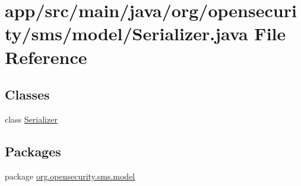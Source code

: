 \hypertarget{a00026}{\section{app/src/main/java/org/opensecurity/sms/model/\+Serializer.java File Reference}
\label{a00026}
}
\subsection*{Classes}
\begin{DoxyCompactItemize}
\item 
class \hyperlink{a00014}{Serializer}
\end{DoxyCompactItemize}
\subsection*{Packages}
\begin{DoxyCompactItemize}
\item 
package \hyperlink{a00035}{org.\+opensecurity.\+sms.\+model}
\end{DoxyCompactItemize}
